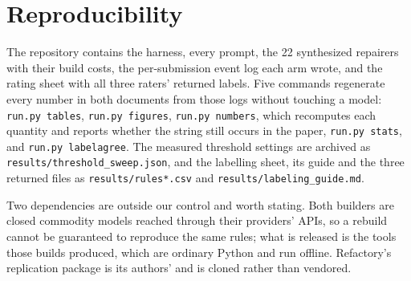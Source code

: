 \documentclass[letterpaper]{article}
\begin{document}
\section{Reproducibility}

The repository contains the harness, every prompt, the 22 synthesized
repairers with their build costs, the per-submission event log each arm wrote,
and the rating sheet with all three raters' returned labels. Five commands
regenerate every number in both documents from those logs without touching a
model: \texttt{run.py tables}, \texttt{run.py figures}, \texttt{run.py
numbers}, which recomputes each quantity and reports whether the string still
occurs in the paper, \texttt{run.py stats}, and \texttt{run.py labelagree}.
The measured threshold settings are archived as
\texttt{results/threshold\_sweep.json}, and the labelling sheet, its guide and
the three returned files as \texttt{results/rules*.csv} and
\texttt{results/labeling\_guide.md}.

Two dependencies are outside our control and worth stating. Both builders are
closed commodity models reached through their providers' APIs, so a rebuild
cannot be guaranteed to reproduce the same rules; what is released is the tools
those builds produced, which are ordinary Python and run offline. Refactory's
replication package is its authors' and is cloned rather than vendored.
\end{document}
